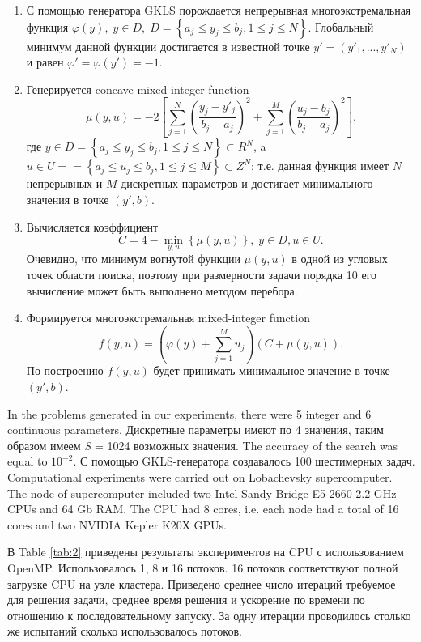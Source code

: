 \documentclass{llncs}
\begin{document}
\begin{enumerate}
	\item С помощью генератора GKLS порождается непрерывная многоэкстремальная функция $\varphi(y), \; y\in D, \; D = \left\{ a_j\leq y_j\leq b_j, 1\leq j \leq N \right\}$. Глобальный минимум данной функции достигается в известной точке $y'=(y'_1,...,y'_N)$ и равен $\varphi'=\varphi(y')=-1$.
	\item Генерируется concave mixed-integer function 
	\[
			\mu(y,u) = -2 \left[ \sum_{j=1}^N \left( \frac{y_j - y'_j}{b_j-a_j} \right)^2 + \sum_{j=1}^M \left( \frac{u_j - b_j}{b_j-a_j} \right)^2 \right].
	\]
	где $y\in D = \left\{ a_j\leq y_j\leq b_j, 1\leq j \leq N \right\} \subset R^N$, a $u\in U = = \left\{ a_j\leq u_j\leq b_j, 1\leq j \leq M \right\} \subset Z^N$; т.е. данная функция имеет $N$ непрерывных и $M$ дискретных параметров и достигает минимального значения в точке $(y',b)$.
	\item Вычисляется коэффициент 
	\[
	C = 4 - \min_{y,u} \left\{ \mu(y,u) \right\}, \; y\in D, u \in U.
	\]
	Очевидно, что минимум вогнутой функции $\mu(y,u)$ в одной из угловых точек области поиска, поэтому при размерности задачи порядка 10 его вычисление может быть выполнено методом перебора.
	\item Формируется многоэкстремальная mixed-integer function 
	\[
	f(y,u) = \left(\varphi(y) + \sum_{j=1}^M{u_j}\right)\left(C + \mu(y,u)\right).
	\]
	По построению $f(y,u)$  будет принимать минимальное значение в точке $(y',b)$.
	
\end{enumerate}


In the problems generated in our experiments, there were 5 integer  and 6 continuous parameters. Дискретные параметры имеют по 4 значения, таким образом имеем \textit{S} = 1024 возможных значения. The accuracy of the search was equal to $10^{-2}$.  С помощью GKLS-генератора создавалось 100 шестимерных задач. 
Computational experiments were carried out on Lobachevsky supercomputer. The node of 
supercomputer included two Intel Sandy Bridge E5-2660 2.2 GHz CPUs and 64 Gb RAM. The 
CPU had 8 cores, i.e. each node had a total of 16 cores and two NVIDIA Kepler K20Х GPUs.



В Table \ref{tab:2} приведены результаты экспериментов на CPU с использованием OpenMP. Использовалось 1, 8 и 16 потоков. 16 потоков соответствуют полной загрузке CPU на узле кластера. Приведено среднее число итераций требуемое для решения задачи, среднее время решения и ускорение по времени по отношению к последовательному запуску. За одну итерации проводилось столько же испытаний сколько использовалось потоков.
\end{document}
